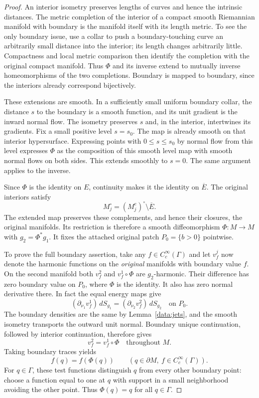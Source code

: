 \begin{proof}
An interior isometry preserves lengths of curves and hence the
intrinsic distances. The metric completion of the interior of a
compact smooth Riemannian manifold with boundary is the manifold
itself with its length metric. To see the only boundary issue,
use a collar to push a boundary-touching curve an arbitrarily
small distance into the interior; its length changes arbitrarily
little. Compactness and local metric comparison then identify
the completion with the original compact manifold.
Thus $\Phi$ and its inverse extend to mutually inverse
homeomorphisms of the two completions. Boundary is mapped to
boundary, since the interiors already correspond bijectively.

These extensions are smooth. In a sufficiently small uniform
boundary collar, the distance $s$ to the boundary is a smooth
function, and its unit gradient is the inward normal flow.
The isometry preserves $s$ and, in the interior, intertwines its
gradients. Fix a small positive level $s=s_0$. The map is already
smooth on that interior hypersurface. Expressing points with
$0\le s\le s_0$ by normal flow from this level expresses $\Phi$
as the composition of this smooth level map with smooth normal
flows on both sides. This extends smoothly to $s=0$. The same
argument applies to the inverse.

Since $\Phi$ is the identity on $E$, continuity makes it the
identity on $\overline E$. The original interiors satisfy
\[
 M_j^\circ=(M_j^e)^\circ\setminus\overline E.
\]
The extended map preserves these complements, and hence their
closures, the original manifolds. Its restriction is therefore a
smooth diffeomorphism $\Phi:M\to M$ with $g_2=\Phi^*g_1$.
It fixes the attached original patch $P_0=\{b>0\}$ pointwise.

To prove the full boundary assertion, take any
$f\in C_c^\infty(\Gamma)$ and let $v_f^j$ now denote the
harmonic functions on the \emph{original} manifolds with boundary
value $f$. On the second manifold both $v_f^2$ and
$v_f^1\circ\Phi$ are $g_2$-harmonic. Their difference has zero
boundary value on $P_0$, where $\Phi$ is the identity.
It also has zero normal derivative there. In fact the equal
energy maps give
\[
 (\partial_{\nu_1}v_f^1)\,dS_{g_1}
 =(\partial_{\nu_2}v_f^2)\,dS_{g_2}
                    \quad\text{on }P_0.
\]
The boundary densities are the same by Lemma~\ref{data:jets},
and the smooth isometry transports the outward unit normal.
Boundary unique continuation, followed by interior continuation,
therefore gives
\[
 v_f^2=v_f^1\circ\Phi\quad\text{throughout }M.
\]
Taking boundary traces yields
\[
 f(q)=f(\Phi(q))\qquad
       (q\in\partial M,\ f\in C_c^\infty(\Gamma)).
\]
For $q\in\Gamma$, these test functions distinguish $q$ from
every other boundary point: choose a function equal to one at
$q$ with support in a small neighborhood avoiding the other
point. Thus $\Phi(q)=q$ for all $q\in\Gamma$.
\end{proof}

